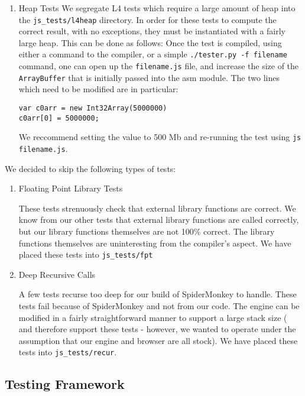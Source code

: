 \documentclass[twoside]{article}
\begin{document}
\begin{multicols}{2}
\begin{enumerate}
  \item Heap Tests
  We segregate L4 tests which require a large amount of heap into the 
  \texttt{js\_tests/l4heap} directory. In order for these tests to compute
  the correct result, with no exceptions, they must be instantiated with a fairly
  large heap. This can be done as follows: Once the test is compiled, using either
  a command to the compiler, or a simple \texttt{./tester.py -f filename} command,
  one can open up the \texttt{filename.js} file, and increase the size of the 
  \texttt{ArrayBuffer} that is initially passed into the asm module. The two lines
  which need to be modified are in particular: 
\begin{verbatim}
var c0arr = new Int32Array(5000000)
c0arr[0] = 5000000;
\end{verbatim}
  We reccommend setting the value to 500 Mb and re-running the test using 
  \texttt{js filename.js}. 
\end{enumerate}

We decided to skip the following types of tests:

\begin{enumerate}

  \item Floating Point Library Tests

    These tests strenuously check that external library functions are correct.
    We know from our other tests that external library functions are called
    correctly, but our library functions themselves are not 100\% correct.
    The library functions themselves are uninteresting from the compiler's
    aspect. We have placed these tests into \texttt{js\_tests/fpt}

  \item Deep Recursive Calls

    A few tests recurse too deep for our build of SpiderMonkey to handle. These
    tests fail because of SpiderMonkey and not from our code. The engine can be 
    modified in a fairly straightforward manner to support a large stack size (
    and therefore support these tests - however, we wanted to operate under the 
    assumption that our engine and browser are all stock). We have placed
    these tests into \texttt{js\_tests/recur}. 

\end{enumerate}

\subsection{Testing Framework}


\end{multicols}
\end{document}
